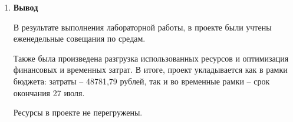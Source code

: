 \documentclass[a4paper,14pt]{extreport} %
\begin{document}
\begin{enumerate}
\item \textbf{Вывод}

В результате выполнения лабораторной работы, в проекте были учтены еженедельные совещания по средам.

Также была произведена разгрузка использованных ресурсов и оптимизация финансовых и временных затрат. В итоге, проект укладывается как в рамки бюджета: затраты -- 48781,79 рублей, так и во временные рамки -- срок окончания 27 июля. 

Ресурсы в проекте не перегружены.

\end{enumerate}
\end{document}
